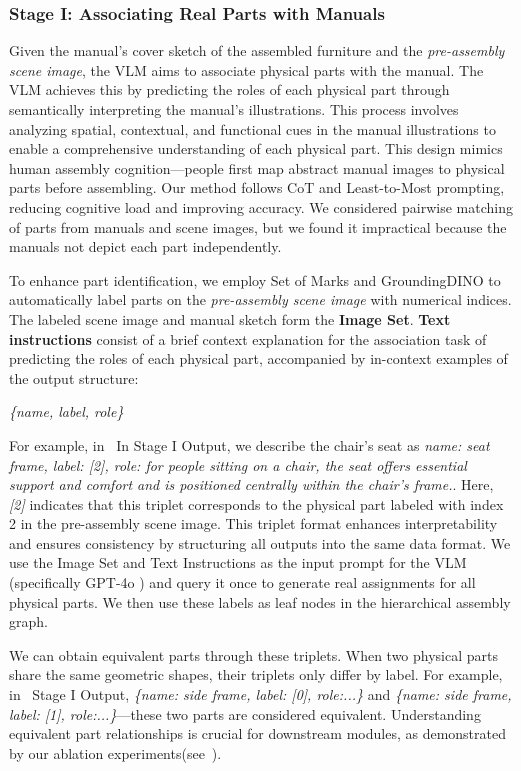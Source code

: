 \subsubsection{Stage I: Associating Real Parts with Manuals} 
Given the manual's cover sketch of the assembled furniture and the \emph{pre-assembly scene image}, the VLM aims to associate physical parts with the manual. The VLM achieves this by predicting the roles of each physical part through semantically interpreting the manual's illustrations. This process involves analyzing spatial, contextual, and functional cues in the manual illustrations to enable a comprehensive understanding of each physical part. This design mimics human assembly cognition—people first map abstract manual images to physical parts before assembling. Our method follows CoT \cite{wei2022chain} and Least-to-Most \cite{zhou2022least} prompting, reducing cognitive load and improving accuracy. 
We considered pairwise matching of parts from manuals and scene images, but we found it impractical because the manuals not depict each part independently.

To enhance part identification, we employ Set of Marks \cite{yang2023set} and GroundingDINO \cite{liu2025grounding} to automatically label parts on the \emph{pre-assembly scene image} with numerical indices. The labeled scene image and manual sketch form the \textbf{Image Set}. \textbf{Text instructions} consist of a brief context explanation for the association task of predicting the roles of each physical part, accompanied by in-context examples of the output structure: \\
\centerline{\emph{\{name, label, role\}}}

For example, in~ In Stage I Output, we describe the chair's seat as \emph{{name: seat frame, label: [2], role: for people sitting on a chair, the seat offers essential support and comfort and is positioned centrally within the chair's frame.}}. Here, \emph{[2]} indicates that this triplet corresponds to the physical part labeled with index 2 in the pre-assembly scene image. This triplet format enhances interpretability and ensures consistency by structuring all outputs into the same data format. We use the Image Set and Text Instructions as the input prompt for the VLM (specifically GPT-4o \cite{achiam2023gpt}) and query it once to generate real assignments for all physical parts. We then use these labels as leaf nodes in the hierarchical assembly graph.

We can obtain equivalent parts through these triplets. When two physical parts share the same geometric shapes, their triplets only differ by label. For example, in~ Stage I Output, \emph{\{name: side frame, label: [0], role:...\}} and \emph{\{name: side frame, label: [1], role:...\}}—these two parts are considered equivalent. Understanding equivalent part relationships is crucial for downstream modules, as demonstrated by our ablation experiments(see~).

